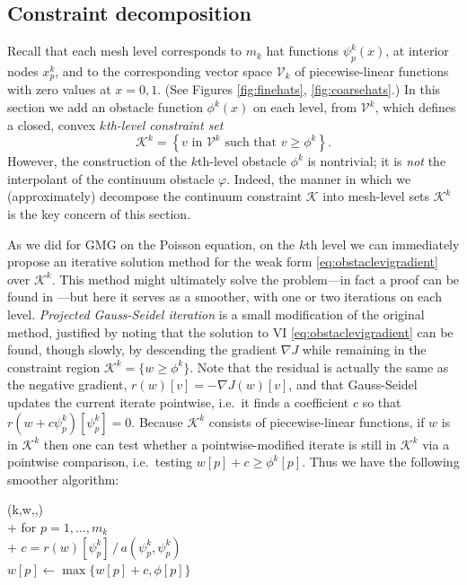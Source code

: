 \documentclass[letterpaper,final,12pt,reqno]{amsart}
\newcommand{\grad}{\nabla}
\numberwithin{equation}{section}
\numberwithin{figure}{section}
\numberwithin{table}{section}
\begin{document}
\subsection*{Constraint decomposition}  Recall that each mesh level corresponds to $m_k$ hat functions $\psi_p^k(x)$, at interior nodes $x_p^k$, and to the corresponding vector space $\mathcal{V}_k$ of piecewise-linear functions with zero values at $x=0,1$.  (See Figures \ref{fig:finehats}, \ref{fig:coarsehats}.)  In this section we add an obstacle function $\phi^k(x)$ on each level, from $\mathcal{V}^k$, which defines a closed, convex $k$\emph{th-level constraint set}
\begin{equation}
\mathcal{K}^k = \left\{v \text{ in } \mathcal{V}^k \text{ such that } v \ge \phi^k\right\}.  \label{eq:levelKdefine}
\end{equation}
However, the construction of the $k$th-level obstacle $\phi^k$ is nontrivial; it is \emph{not} the interpolant of the continuum obstacle $\varphi$.  Indeed, the manner in which we (approximately) decompose the continuum constraint $\mathcal{K}$ into mesh-level sets $\mathcal{K}^k$ is the key concern of this section.

As we did for GMG on the Poisson equation, on the $k$th level we can immediately propose an iterative solution method for the weak form \eqref{eq:obstaclevigradient} over $\mathcal{K}^k$.  This method might ultimately solve the problem---in fact a proof can be found in \cite{KinderlehrerStampacchia1980}---but here it serves as a smoother, with one or two iterations on each level.  \emph{Projected Gauss-Seidel iteration} is a small modification of the original method, justified by noting that the solution to VI \eqref{eq:obstaclevigradient} can be found, though slowly, by descending the gradient $\grad J$ while remaining in the constraint region $\mathcal{K}^k = \{w\ge \phi^k\}$.  Note that the residual is actually the same as the negative gradient, $r(w)[v] = - \grad J(w)[v]$, and that Gauss-Seidel updates the current iterate pointwise, i.e.~it finds a coefficient $c$ so that $r(w+c\psi_p^k)[\psi_p^k]=0$.  Because $\mathcal{K}^k$ consists of piecewise-linear functions, if $w$ is in $\mathcal{K}^k$ then one can test whether a pointwise-modified iterate is still in $\mathcal{K}^k$ via a pointwise comparison, i.e.~testing $w[p] + c \ge \phi^k[p]$.  Thus we have the following smoother algorithm:
\begin{pseudo*}
(k,w,\ell,\phi)\text{:} \\+
    for $p=1,\dots,m_k$ \\+
        $\displaystyle c = r(w)[\psi_p^k] \, \big/ \,a(\psi_p^k,\psi_p^k)$ \qquad {} \\
        $w[p] \gets \max\{w[p] + c,\phi[p]\}$
\end{pseudo*}
\end{document}
